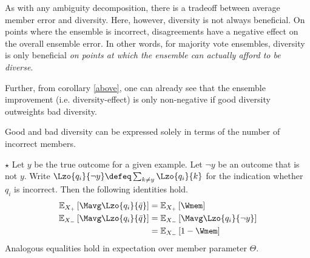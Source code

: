 \documentclass[../main.tex]{subfiles}
\begin{document}

As with any ambiguity decomposition, there is a tradeoff between average member error and diversity. Here, however, diversity is not always beneficial. On points where the ensemble is incorrect, disagreements have a negative effect on the overall ensemble error.
In other words, for majority vote ensembles, diversity is only beneficial \textit{on points at which the ensemble can actually afford to be diverse}. 

Further, from corollary \ref{above}, one can already see that the ensemble improvement (i.e. diversity-effect) is only non-negative if good diversity outweights bad diversity.


Good and bad diversity can be expressed solely in terms of the number of incorrect members. 
\begin{lemma} $\star$ Let $y$ be the true outcome for a given example. Let $\neg y$ be an outcome that is not $y$. Write $\Lzo{q_i}{\neg y} \defeq \sum_{k \not= y} \Lzo{q_i}{k}$ for the indication whether $q_i$ is incorrect. Then the following identities hold.
\begin{align*}
\mathbb{E}_{X_{+}}\left[ \Mavg \Lzo{q_{i}}{\bar{q}} \right] &=
\mathbb{E}_{X_{+}}\left[ \Wmem \right]   \\
\mathbb{E}_{X_{-}}\left[ \Mavg \Lzo{q_{i}}{\bar{q}} \right]  &= \mathbb{E}_{X_{-}}\left[ \Mavg  \Lzo{q_{i}}{\neg y} \right]  \\
&=
\mathbb{E}_{X_{-}}\left[ 1 - \Wmem \right]
\end{align*}
Analogous equalities hold in expectation over member parameter $\Theta$.
\end{lemma}
\end{document}
